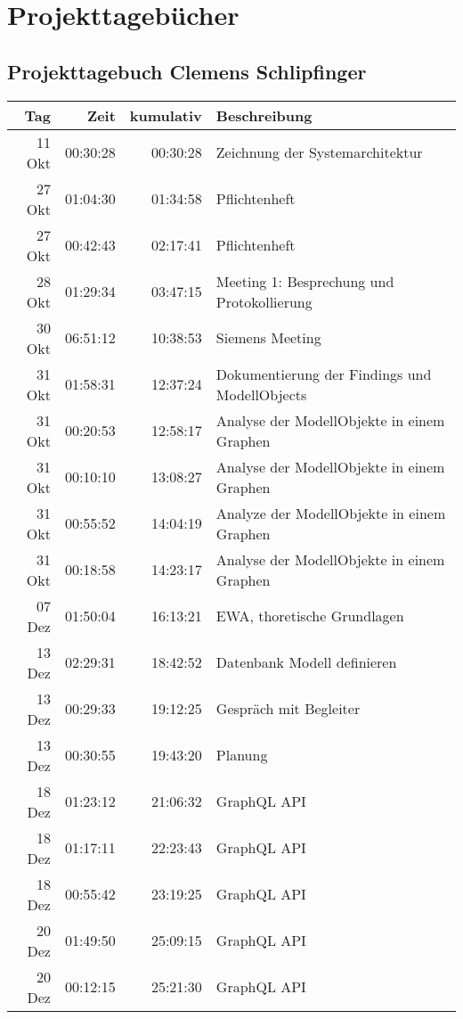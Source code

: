 \section{Projekttagebücher}
\subsection{Projekttagebuch Clemens Schlipfinger}

\begin{longtable}{r | r | r | p{}}
     Tag & Zeit & kumulativ & Beschreibung \\
     \hline

	 11 Okt & 00:30:28 & 00:30:28 & Zeichnung der Systemarchitektur \\ 
	 27 Okt & 01:04:30 & 01:34:58 & Pflichtenheft \\ 
	 27 Okt & 00:42:43 & 02:17:41 & Pflichtenheft \\ 
	 28 Okt & 01:29:34 & 03:47:15 & Meeting 1: Besprechung und Protokollierung \\ 
	 30 Okt & 06:51:12 & 10:38:53 & Siemens Meeting \\ 
	 31 Okt & 01:58:31 & 12:37:24 & Dokumentierung der Findings und ModellObjects \\ 
	 31 Okt & 00:20:53 & 12:58:17 & Analyse der ModellObjekte in einem Graphen \\ 
	 31 Okt & 00:10:10 & 13:08:27 & Analyse der ModellObjekte in einem Graphen \\ 
	 31 Okt & 00:55:52 & 14:04:19 & Analyze der ModellObjekte in einem Graphen \\ 
	 31 Okt & 00:18:58 & 14:23:17 & Analyse der ModellObjekte in einem Graphen \\ 
	 07 Dez & 01:50:04 & 16:13:21 & EWA, thoretische Grundlagen \\ 
	 13 Dez & 02:29:31 & 18:42:52 & Datenbank Modell definieren \\ 
	 13 Dez & 00:29:33 & 19:12:25 & Gespräch mit Begleiter \\ 
	 13 Dez & 00:30:55 & 19:43:20 & Planung \\ 
	 18 Dez & 01:23:12 & 21:06:32 & GraphQL API \\ 
	 18 Dez & 01:17:11 & 22:23:43 & GraphQL API \\ 
	 18 Dez & 00:55:42 & 23:19:25 & GraphQL API \\ 
	 20 Dez & 01:49:50 & 25:09:15 & GraphQL API \\ 
	 20 Dez & 00:12:15 & 25:21:30 & GraphQL API \\ 

\end{longtable}
